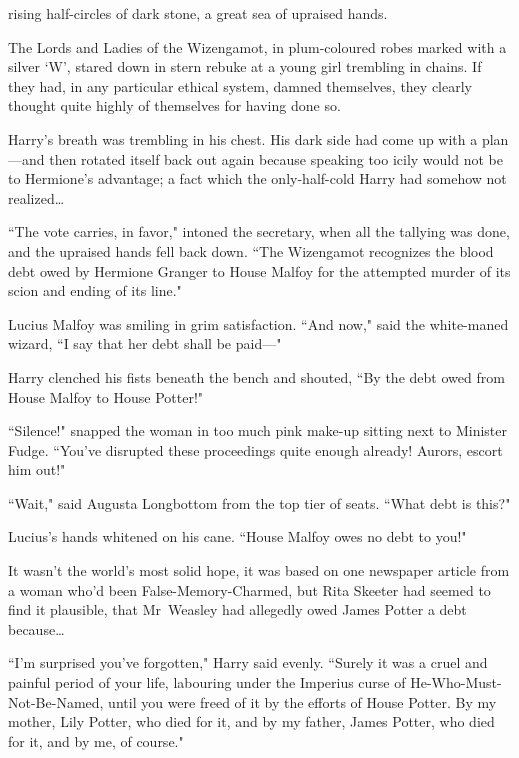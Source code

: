 
 rising half-circles of dark stone, a great sea of upraised hands.

\hplettrineextrapara
The Lords and Ladies of the Wizengamot, in plum-coloured robes marked with a silver `W', stared down in stern rebuke at a young girl trembling in chains. If they had, in any particular ethical system, damned themselves, they clearly thought quite highly of themselves for having done so.

Harry's breath was trembling in his chest. His dark side had come up with a plan—and then rotated itself back out again because speaking too icily would not be to Hermione's advantage; a fact which the only-half-cold Harry had somehow not realized{\ldots}

``The vote carries, in favor," intoned the secretary, when all the tallying was done, and the upraised hands fell back down. ``The Wizengamot recognizes the blood debt owed by Hermione Granger to House Malfoy for the attempted murder of its scion and ending of its line."

Lucius Malfoy was smiling in grim satisfaction. ``And now," said the white-maned wizard, ``I say that her debt shall be paid—"

Harry clenched his fists beneath the bench and shouted, ``By the debt owed from House Malfoy to House Potter!"

``Silence!" snapped the woman in too much pink make-up sitting next to Minister Fudge. ``You've disrupted these proceedings quite enough already! Aurors, escort him out!"

``Wait," said Augusta Longbottom from the top tier of seats. ``What debt is this?"

Lucius's hands whitened on his cane. ``House Malfoy owes no debt to you!"

It wasn't the world's most solid hope, it was based on one newspaper article from a woman who'd been False-Memory-Charmed, but Rita Skeeter had seemed to find it plausible, that Mr~Weasley had allegedly owed James Potter a debt because{\ldots}

``I'm surprised you've forgotten," Harry said evenly. ``Surely it was a cruel and painful period of your life, labouring under the Imperius curse of He-Who-Must-Not-Be-Named, until you were freed of it by the efforts of House Potter. By my mother, Lily Potter, who died for it, and by my father, James Potter, who died for it, and by me, of course."


